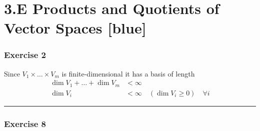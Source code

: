 \documentclass[12pt, letterpaper]{scrartcl}
\begin{document}
\clearpage
\section*{3.E Products and Quotients of Vector Spaces \xrfill[2pt]{3pt}[blue]}
\subsubsection*{Exercise 2}
Since $V_1\times\dots\times V_m$ is finite-dimensional it has a basis of length
\begin{align*}
    \dim V_1+\dots+\dim V_m&<\infty\\
    \dim V_i&<\infty \quad (\dim V_i\geq 0) \quad\forall i  
\end{align*}
\vskip1mm\hrule

\subsubsection*{Exercise 8}
\end{document}
